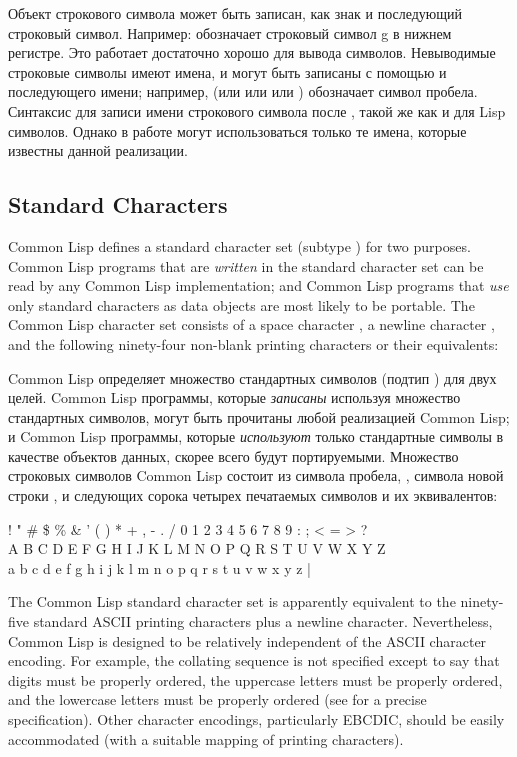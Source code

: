 Объект строкового символа может быть записан, как знак \cd{\#{\Xbackslash}} и последующий строковый символ. Например:  
обозначает строковый символ g в нижнем регистре. Это работает достаточно хорошо
для вывода символов. Невыводимые строковые символы имеют имена, и могут быть
записаны с помощью \cd{\#{\Xbackslash}} и последующего имени; например,
 (или  или
 или ) обозначает символ пробела.
Синтаксис для записи имени строкового символа после \cd{\#{\Xbackslash}}, такой
же как и для Lisp символов. Однако в работе могут использоваться только те
имена, которые известны данной реализации.

\subsection{Standard Characters}

Common Lisp defines a standard character set (subtype )
for two purposes.
Common Lisp programs that are \emph{written} in the standard character set
can be read by any Common Lisp implementation; and Common Lisp programs
that \emph{use} only standard characters as data objects are most likely
to be portable.  The Common Lisp character set consists of a space character
, a newline character , and the
following ninety-four
non-blank printing characters or their equivalents:

Common Lisp определяет множество стандартных символов (подтип
) для двух целей.
Common Lisp программы, которые \emph{записаны} используя множество стандартных
символов, могут быть прочитаны любой реализацией Common Lisp; и Common Lisp
программы, которые \emph{используют} только стандартные символы в качестве
объектов данных, скорее всего будут портируемыми. Множество строковых символов
Common Lisp состоит из символа пробела, , символа
новой строки , и следующих сорока четырех печатаемых
символов и их эквивалентов:
\begin{lisp}
! " \# \$ \% \& ' ( ) * + , - . / 0 1 2 3 4 5 6 7 8 9 : ; < = > ? \\
{\Xatsign} A B C D E F G H I J K L M N O P Q R S T U V W X Y Z {\Xlbracket} {\Xbackslash} {\Xrbracket} {\Xcircumflex} {\Xunderscore} \\
{\Xbq} a b c d e f g h i j k l m n o p q r s t u v w x y z {\Xlbrace} | {\Xrbrace} {\Xtilde}
\end{lisp}
The Common Lisp standard character set is apparently equivalent to
the ninety-five standard ASCII printing characters plus a newline character.
Nevertheless, Common Lisp is designed to be relatively independent of
the ASCII character encoding.  For example, the collating sequence
is not specified except to say that digits must be properly ordered,
the uppercase letters must be properly ordered, and
the lowercase letters must be properly ordered
(see  for a precise specification).
Other character encodings, particularly EBCDIC, should be easily accommodated
(with a suitable mapping of printing characters).

